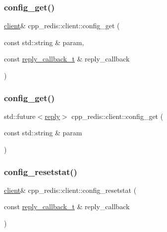 \subsubsection{\texorpdfstring{config\+\_\+get()}{config\_get()}\hspace{0.1cm}{\footnotesize\ttfamily [1/2]}}
{\footnotesize\ttfamily \hyperlink{classcpp__redis_1_1client}{client}\& cpp\+\_\+redis\+::client\+::config\+\_\+get (\begin{DoxyParamCaption}\item[{const std\+::string \&}]{param,  }\item[{const \hyperlink{classcpp__redis_1_1client_a061a1140d36d2eaeda82b09a0bb3f9f2}{reply\+\_\+callback\+\_\+t} \&}]{reply\+\_\+callback }\end{DoxyParamCaption})}

\mbox{\label{classcpp__redis_1_1client_a221b1e414a4b1bb4eb2a7afaac0eb39d}} 
\subsubsection{\texorpdfstring{config\+\_\+get()}{config\_get()}\hspace{0.1cm}{\footnotesize\ttfamily [2/2]}}
{\footnotesize\ttfamily std\+::future$<$\hyperlink{classcpp__redis_1_1reply}{reply}$>$ cpp\+\_\+redis\+::client\+::config\+\_\+get (\begin{DoxyParamCaption}\item[{const std\+::string \&}]{param }\end{DoxyParamCaption})}

\mbox{\label{classcpp__redis_1_1client_a4b1361aa6c997b76a059c144a302b5be}} 
\subsubsection{\texorpdfstring{config\+\_\+resetstat()}{config\_resetstat()}\hspace{0.1cm}{\footnotesize\ttfamily [1/2]}}
{\footnotesize\ttfamily \hyperlink{classcpp__redis_1_1client}{client}\& cpp\+\_\+redis\+::client\+::config\+\_\+resetstat (\begin{DoxyParamCaption}\item[{const \hyperlink{classcpp__redis_1_1client_a061a1140d36d2eaeda82b09a0bb3f9f2}{reply\+\_\+callback\+\_\+t} \&}]{reply\+\_\+callback }\end{DoxyParamCaption})}

